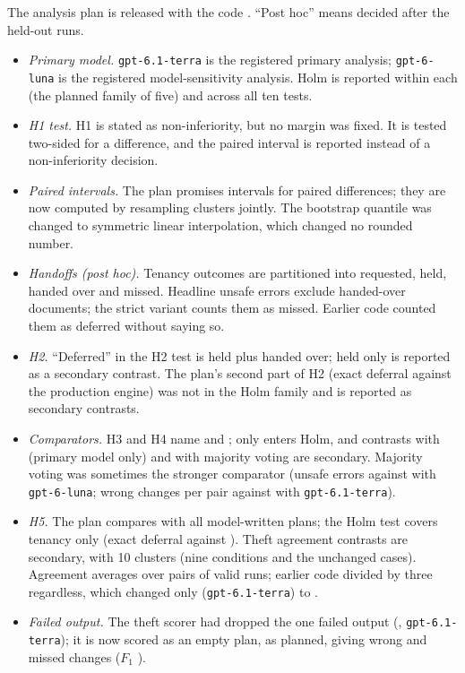 The analysis plan is released with the code \cite{casepath2026repo}. ``Post hoc'' means decided after the held-out runs.
\begin{itemize}[leftmargin=1.2em,itemsep=1pt]
\item \emph{Primary model.} \texttt{gpt-6.1-terra} is the registered primary analysis; \texttt{gpt-6-luna} is the registered model-sensitivity analysis. Holm is reported within each (the planned family of five) and across all ten tests.
\item \emph{H1 test.} H1 is stated as non-inferiority, but no margin was fixed. It is tested two-sided for a difference, and the paired interval is reported instead of a non-inferiority decision.
\item \emph{Paired intervals.} The plan promises intervals for paired differences; they are now computed by resampling clusters jointly. The bootstrap quantile was changed to symmetric linear interpolation, which changed no rounded number.
\item \emph{Handoffs (post hoc).} Tenancy outcomes are partitioned into requested, held, handed over and missed. Headline unsafe errors exclude handed-over documents; the strict variant counts them as missed. Earlier code counted them as deferred without saying so.
\item \emph{H2.} ``Deferred'' in the H2 test is held plus handed over; held only is reported as a secondary contrast. The plan's second part of H2 (exact deferral against the production engine) was not in the Holm family and is reported as secondary contrasts.
\item \emph{Comparators.} H3 and H4 name  and ; only  enters Holm, and contrasts with  (primary model only) and with majority voting are secondary. Majority voting was sometimes the stronger comparator (unsafe errors \tenLunaBscUnsafe{} against \tenLunaBoneUnsafe{} with \texttt{gpt-6-luna}; wrong changes per pair \thTerraRscWrongPP{} against \thTerraRWrongPP{} with \texttt{gpt-6.1-terra}).
\item \emph{H5.} The plan compares \casepath with all model-written plans; the Holm test covers tenancy only (exact deferral against ). Theft agreement contrasts are secondary, with 10 clusters (nine conditions and the unchanged cases). Agreement averages over pairs of valid runs; earlier code divided by three regardless, which changed only  (\texttt{gpt-6.1-terra}) to \thTerraDRetest.
\item \emph{Failed output.} The theft scorer had dropped the one failed output (, \texttt{gpt-6.1-terra}); it is now scored as an empty plan, as planned, giving \thTerraDWrong{} wrong and \thTerraDMissed{} missed changes ($F_1$ \thTerraDFone).

\end{itemize}
